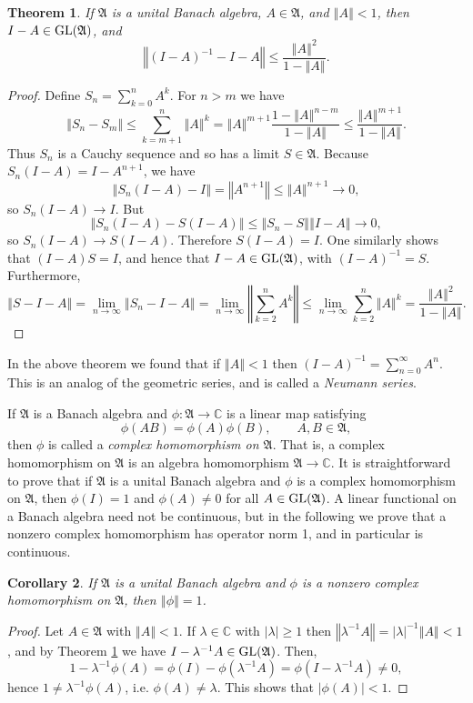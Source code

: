 \documentclass{article}
\newcommand{\GL}{\ensuremath\mathrm{GL}}
\newcommand{\norm}[1]{\left\Vert #1 \right\Vert}
\newtheorem{theorem}{Theorem}
\newtheorem{corollary}[theorem]{Corollary}
\theoremstyle{definition}
\begin{document}
 \begin{theorem}
 If $\mathfrak{A}$ is a unital Banach algebra, $A \in \mathfrak{A}$, and $\norm{A} < 1$, then $I-A \in \GL(\mathfrak{A})$, and
 \[
 \norm{(I-A)^{-1}-I-A} \leq \frac{\norm{A}^2}{1-\norm{A}}.
 \]
 \label{neumann}
 \end{theorem}
 \begin{proof}
 Define $S_n=\sum_{k=0}^n A^k$. For $n > m$ we have
 \[
 \norm{S_n-S_m} \leq \sum_{k=m+1}^n \norm{A}^k = \norm{A}^{m+1} \frac{1-\norm{A}^{n-m}}{1-\norm{A}} \leq \frac{\norm{A}^{m+1}}{1-\norm{A}}.
 \]
 Thus $S_n$ is a Cauchy sequence and so has a limit $S \in \mathfrak{A}$. Because
 $ S_n (I-A) = I-A^{n+1}$,
 we have
 \[
 \norm{S_n(I-A)-I} = \norm{A^{n+1}} \leq \norm{A}^{n+1} \to 0,
 \]
 so $S_n(I-A) \to I$. But
 \[
 \norm{S_n(I-A) -S(I-A)} \leq \norm{S_n-S}\norm{I-A} \to 0,
 \]
 so $S_n(I-A) \to S(I-A)$. Therefore $S(I-A)=I$. One similarly shows that $(I-A)S=I$, and hence that $I-A \in \GL(\mathfrak{A})$,
 with $(I-A)^{-1}=S$. 
Furthermore,
\[
\norm{S-I-A} = \lim_{n \to \infty} \norm{S_n-I-A} = \lim_{n \to \infty} \norm{\sum_{k=2}^n A^k}
\leq \lim_{n \to \infty} \sum_{k=2}^n \norm{A}^k
=\frac{\norm{A}^2}{1-\norm{A}}.
\]
 \end{proof}
 
 In the above  theorem we found that if $\norm{A}<1$ then $(I-A)^{-1} = \sum_{n=0}^\infty A^n$. This is an analog of the geometric series, and is called
 a {\em Neumann series}. 
 
 If $\mathfrak{A}$ is a Banach algebra and $\phi:\mathfrak{A} \to \mathbb{C}$ is a linear map satisfying
 \[
 \phi(AB)=\phi(A)\phi(B),\qquad A,B \in \mathfrak{A},
 \]
 then $\phi$ is called a {\em complex homomorphism on $\mathfrak{A}$}.
 That is, a complex homomorphism on $\mathfrak{A}$ is an algebra homomorphism $\mathfrak{A} \to \mathbb{C}$. It is straightforward to prove that if $\mathfrak{A}$ is a unital
 Banach algebra and $\phi$ is a complex homomorphism on $\mathfrak{A}$, then $\phi(I)=1$ and $\phi(A) \neq 0$ for all $A \in \GL(\mathfrak{A})$. A linear functional
 on a Banach algebra need not be continuous, but in the following  we prove that a nonzero complex homomorphism has operator norm 1, and in particular is continuous.
 
  \begin{corollary}
 If $\mathfrak{A}$ is a unital Banach algebra and $\phi$ is a nonzero complex homomorphism on $\mathfrak{A}$, then $\norm{\phi}=1$.
 \end{corollary}
 \begin{proof}
 Let $A \in \mathfrak{A}$ with $\norm{A}<1$. If $\lambda \in \mathbb{C}$ with $|\lambda| \geq 1$ then $\norm{\lambda^{-1}A}=|\lambda|^{-1} \norm{A}<1$, and
by Theorem \ref{neumann} we have $I-\lambda^{-1}A \in \GL(\mathfrak{A})$. Then,
\[
1-\lambda^{-1} \phi(A) = \phi(I)-\phi(\lambda^{-1}A) =\phi(I-\lambda^{-1}A) \neq 0,
\]
hence $1 \neq \lambda^{-1} \phi(A)$, i.e. $\phi(A) \neq \lambda$. This shows that $|\phi(A)| < 1$. 
 \end{proof}
\end{document}
